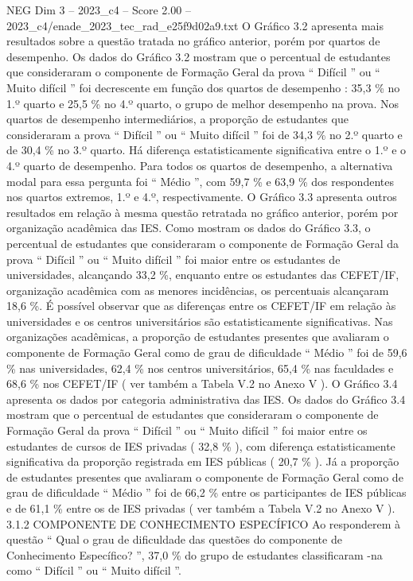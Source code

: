 \begin{textsample}{NEG Dim 3 – 2023\_c4 – Score 2.00 – 2023\_c4/enade\_2023\_tec\_rad\_e25f9d02a9.txt}
O Gráfico 3.2 apresenta mais resultados sobre a questão tratada no gráfico anterior, porém por quartos de desempenho.
Os dados do Gráfico 3.2 mostram que o percentual de estudantes que consideraram o componente de Formação Geral da prova “ Difícil ” ou “ Muito difícil ” foi decrescente em função dos quartos de desempenho : 35,3 \% no 1.º quarto e 25,5 \% no 4.º quarto, o grupo de melhor desempenho na prova.
Nos quartos de desempenho intermediários, a proporção de estudantes que consideraram a prova “ Difícil ” ou “ Muito difícil ” foi de 34,3 \% no 2.º quarto e de 30,4 \% no 3.º quarto.
Há diferença estatisticamente significativa entre o 1.º e o 4.º quarto de desempenho.
Para todos os quartos de desempenho, a alternativa modal para essa pergunta foi “ Médio ”, com 59,7 \% e 63,9 \% dos respondentes nos quartos extremos, 1.º e 4.º, respectivamente.
O Gráfico 3.3 apresenta outros resultados em relação à mesma questão retratada no gráfico anterior, porém por organização acadêmica das IES.
Como mostram os dados do Gráfico 3.3, o percentual de estudantes que consideraram o componente de Formação Geral da prova “ Difícil ” ou “ Muito difícil ” foi maior entre os estudantes de universidades, alcançando 33,2 \%, enquanto entre os estudantes das CEFET/IF, organização acadêmica com as menores incidências, os percentuais alcançaram 18,6 \%.
É possível observar que as diferenças entre os CEFET/IF em relação às universidades e os centros universitários são estatisticamente significativas.
Nas organizações acadêmicas, a proporção de estudantes presentes que avaliaram o componente de Formação Geral como de grau de dificuldade “ Médio ” foi de 59,6 \% nas universidades, 62,4 \% nos centros universitários, 65,4 \% nas faculdades e 68,6 \% nos CEFET/IF ( ver também a Tabela V.2 no Anexo V ).
O Gráfico 3.4 apresenta os dados por categoria administrativa das IES.
Os dados do Gráfico 3.4 mostram que o percentual de estudantes que consideraram o componente de Formação Geral da prova “ Difícil ” ou “ Muito difícil ” foi maior entre os estudantes de cursos de IES privadas ( 32,8 \% ), com diferença estatisticamente significativa da proporção registrada em IES públicas ( 20,7 \% ).
Já a proporção de estudantes presentes que avaliaram o componente de Formação Geral como de grau de dificuldade “ Médio ” foi de 66,2 \% entre os participantes de IES públicas e de 61,1 \% entre os de IES privadas ( ver também a Tabela V.2 no Anexo V ). 3.1.2 COMPONENTE DE CONHECIMENTO ESPECÍFICO Ao responderem à questão “ Qual o grau de dificuldade das questões do componente de Conhecimento Específico? ”, 37,0 \% do grupo de estudantes classificaram -na como “ Difícil ” ou “ Muito difícil ”.

\end{textsample}
